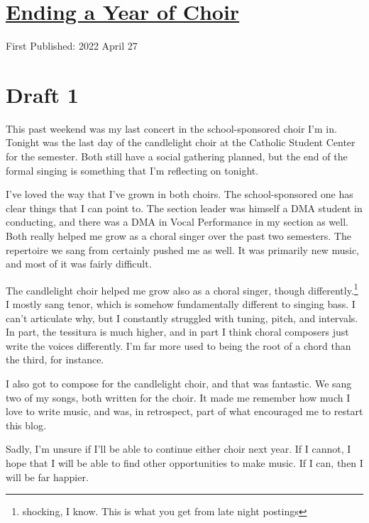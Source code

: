 \documentclass[12pt]{article}[titlepage]
\renewcommand{\,}{\textsuperscript{,}}
\begin{document}
\doublespacing
\section{\href{ending-choir-spring-2022.html}{Ending a Year of Choir}}
First Published: 2022 April 27

\section{Draft 1}
This past weekend was my last concert in the school-sponsored choir I'm in.
Tonight was the last day of the candlelight choir at the Catholic Student Center for the semester.
Both still have a social gathering planned, but the end of the formal singing is something that I'm reflecting on tonight.

I've loved the way that I've grown in both choirs.
The school-sponsored one has clear things that I can point to.
The section leader was himself a DMA student in conducting, and there was a DMA in Vocal Performance in my section as well.
Both really helped me grow as a choral singer over the past two semesters.
The repertoire we sang from certainly pushed me as well.
It was primarily new music, and most of it was fairly difficult.

The candlelight choir helped me grow also as a choral singer, though differently.\footnote{shocking, I know. This is what you get from late night postings}
I mostly sang tenor, which is somehow fundamentally different to singing bass.
I can't articulate why, but I constantly struggled with tuning, pitch, and intervals.
In part, the tessitura is much higher, and in part I think choral composers just write the voices differently.
I'm far more used to being the root of a chord than the third, for instance.

I also got to compose for the candlelight choir, and that was fantastic.
We sang two of my songs, both written for the choir.
It made me remember how much I love to write music, and was, in retrospect, part of what encouraged me to restart this blog.

Sadly, I'm unsure if I'll be able to continue either choir next year.
If I cannot, I hope that I will be able to find other opportunities to make music.
If I can, then I will be far happier. 
\end{document}
